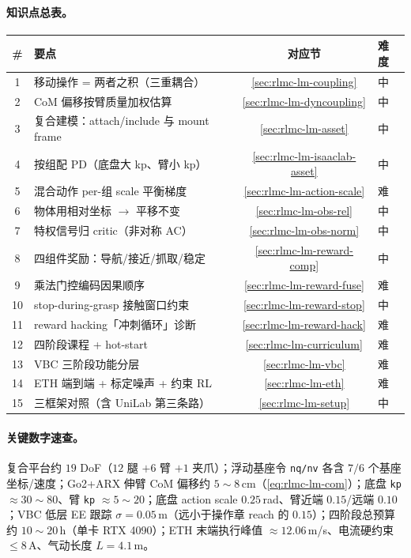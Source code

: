 \paragraph{知识点总表。}
\begin{center}
\small
\begin{tabular}{@{}clcl@{}}
\toprule
\# & 要点 & 对应节 & 难度 \\
\midrule
1 & 移动操作 = 两者之积（三重耦合）& \cref{sec:rlmc-lm-coupling} & 中 \\
2 & CoM 偏移按臂质量加权估算 & \cref{sec:rlmc-lm-dyncoupling} & 中 \\
3 & 复合建模：attach/include 与 mount frame & \cref{sec:rlmc-lm-asset} & 中 \\
4 & 按组配 PD（底盘大 kp、臂小 kp）& \cref{sec:rlmc-lm-isaaclab-asset} & 中 \\
5 & 混合动作 per-组 scale 平衡梯度 & \cref{sec:rlmc-lm-action-scale} & 难 \\
6 & 物体用相对坐标 $\to$ 平移不变 & \cref{sec:rlmc-lm-obs-rel} & 中 \\
7 & 特权信号归 critic（非对称 AC）& \cref{sec:rlmc-lm-obs-norm} & 中 \\
8 & 四组件奖励：导航/接近/抓取/稳定 & \cref{sec:rlmc-lm-reward-comp} & 中 \\
9 & 乘法门控编码因果顺序 & \cref{sec:rlmc-lm-reward-fuse} & 难 \\
10 & stop-during-grasp 接触窗口约束 & \cref{sec:rlmc-lm-reward-stop} & 中 \\
11 & reward hacking「冲刺循环」诊断 & \cref{sec:rlmc-lm-reward-hack} & 难 \\
12 & 四阶段课程 + hot-start & \cref{sec:rlmc-lm-curriculum} & 难 \\
13 & VBC 三阶段功能分层 & \cref{sec:rlmc-lm-vbc} & 难 \\
14 & ETH 端到端 + 标定噪声 + 约束 RL & \cref{sec:rlmc-lm-eth} & 难 \\
15 & 三框架对照（含 UniLab 第三条路）& \cref{sec:rlmc-lm-setup} & 中 \\
\bottomrule
\end{tabular}
\end{center}

\paragraph{关键数字速查。}复合平台约 $19$ DoF（$12$ 腿 $+6$ 臂 $+1$ 夹爪）；浮动基座令 \verb|nq/nv| 各含 $7/6$ 个基座坐标/速度；Go2+ARX 伸臂 CoM 偏移约 $5\!\sim\!8\,$cm（\cref{eq:rlmc-lm-com}）；底盘 \verb|kp| $\approx30\!\sim\!80$、臂 \verb|kp| $\approx5\!\sim\!20$；底盘 action scale $0.25\,$rad、臂近端 $0.15$/远端 $0.10$；VBC 低层 EE 跟踪 $\sigma=0.05\,$m（远小于操作章 reach 的 $0.15$）；四阶段总预算约 $10\!\sim\!20\,$h（单卡 RTX 4090）；ETH 末端执行峰值 $\approx12.06\,$m/s、电流硬约束 $\le 8\,$A、气动长度 $L=4.1\,$m。

